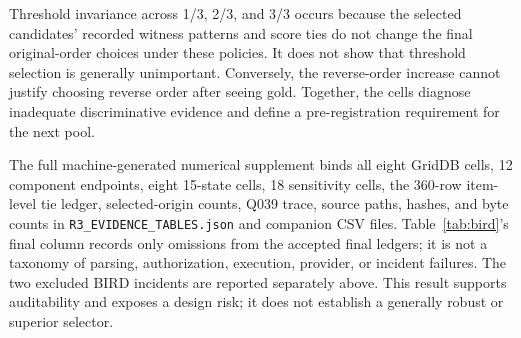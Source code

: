 \documentclass[applsci,article,submit,moreauthors]{Definitions/mdpi}
\begin{document}
Threshold invariance across 1/3, 2/3, and 3/3 occurs because the selected candidates' recorded witness patterns and score ties do not change the final original-order choices under these policies. It does not show that threshold selection is generally unimportant. Conversely, the reverse-order increase cannot justify choosing reverse order after seeing gold. Together, the cells diagnose inadequate discriminative evidence and define a pre-registration requirement for the next pool.

\begin{table}[htbp]
\caption{All 18 complete-witness selector sensitivity cells. Each row contains the original- and reverse-order cells for one weight/threshold combination; coverage is 180/180 throughout.}
\label{tab:sensitivity}
\centering
\small
{}
\end{table}

The full machine-generated numerical supplement binds all eight GridDB cells, 12 component endpoints, eight 15-state cells, 18 sensitivity cells, the 360-row item-level tie ledger, selected-origin counts, Q039 trace, source paths, hashes, and byte counts in \texttt{R3\_EVIDENCE\_TABLES.json} and companion CSV files. Table~\ref{tab:bird}'s final column records only omissions from the accepted final ledgers; it is not a taxonomy of parsing, authorization, execution, provider, or incident failures. The two excluded BIRD incidents are reported separately above. This result supports auditability and exposes a design risk; it does not establish a generally robust or superior selector.
\end{document}
